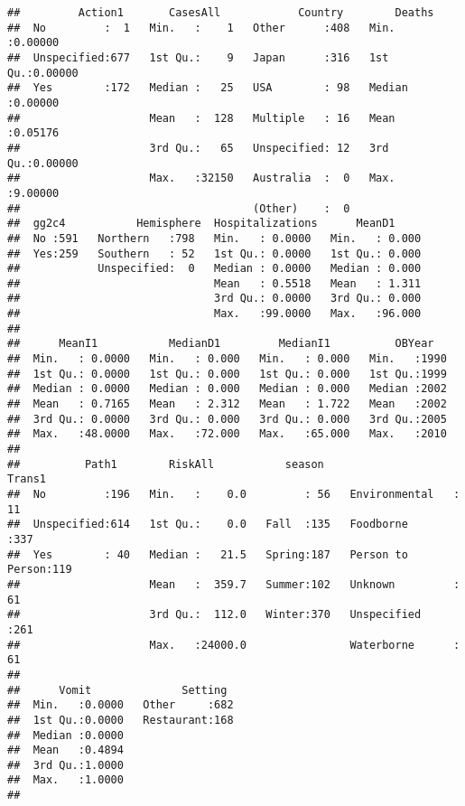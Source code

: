 \documentclass[]{article}
\begin{document}
\begin{verbatim}
##         Action1       CasesAll            Country        Deaths       
##  No         :  1   Min.   :    1   Other      :408   Min.   :0.00000  
##  Unspecified:677   1st Qu.:    9   Japan      :316   1st Qu.:0.00000  
##  Yes        :172   Median :   25   USA        : 98   Median :0.00000  
##                    Mean   :  128   Multiple   : 16   Mean   :0.05176  
##                    3rd Qu.:   65   Unspecified: 12   3rd Qu.:0.00000  
##                    Max.   :32150   Australia  :  0   Max.   :9.00000  
##                                    (Other)    :  0                    
##  gg2c4           Hemisphere  Hospitalizations      MeanD1      
##  No :591   Northern   :798   Min.   : 0.0000   Min.   : 0.000  
##  Yes:259   Southern   : 52   1st Qu.: 0.0000   1st Qu.: 0.000  
##            Unspecified:  0   Median : 0.0000   Median : 0.000  
##                              Mean   : 0.5518   Mean   : 1.311  
##                              3rd Qu.: 0.0000   3rd Qu.: 0.000  
##                              Max.   :99.0000   Max.   :96.000  
##                                                                
##      MeanI1           MedianD1         MedianI1          OBYear    
##  Min.   : 0.0000   Min.   : 0.000   Min.   : 0.000   Min.   :1990  
##  1st Qu.: 0.0000   1st Qu.: 0.000   1st Qu.: 0.000   1st Qu.:1999  
##  Median : 0.0000   Median : 0.000   Median : 0.000   Median :2002  
##  Mean   : 0.7165   Mean   : 2.312   Mean   : 1.722   Mean   :2002  
##  3rd Qu.: 0.0000   3rd Qu.: 0.000   3rd Qu.: 0.000   3rd Qu.:2005  
##  Max.   :48.0000   Max.   :72.000   Max.   :65.000   Max.   :2010  
##                                                                    
##          Path1        RiskAll           season                 Trans1   
##  No         :196   Min.   :    0.0         : 56   Environmental   : 11  
##  Unspecified:614   1st Qu.:    0.0   Fall  :135   Foodborne       :337  
##  Yes        : 40   Median :   21.5   Spring:187   Person to Person:119  
##                    Mean   :  359.7   Summer:102   Unknown         : 61  
##                    3rd Qu.:  112.0   Winter:370   Unspecified     :261  
##                    Max.   :24000.0                Waterborne      : 61  
##                                                                         
##      Vomit              Setting   
##  Min.   :0.0000   Other     :682  
##  1st Qu.:0.0000   Restaurant:168  
##  Median :0.0000                   
##  Mean   :0.4894                   
##  3rd Qu.:1.0000                   
##  Max.   :1.0000                   
## 
\end{verbatim}
\end{document}
